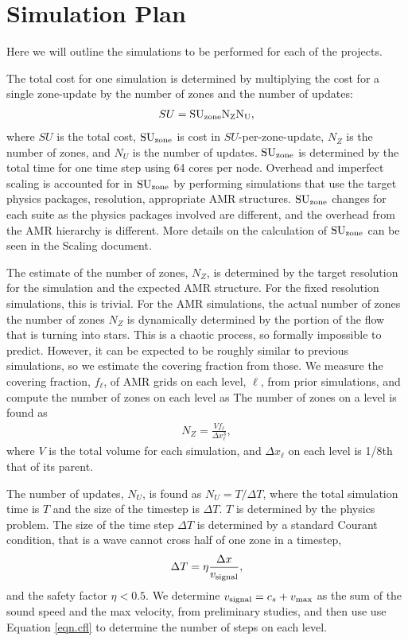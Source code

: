 \section{Simulation Plan}
\label{sec.plan}

Here we will outline the simulations to be performed for each of the projects.

The total cost for one simulation is determined by multiplying the cost for a
single zone-update by the number of zones and the number of updates:
\begin{align}
SU = \rm{SU}_{\rm{zone}} N_Z N_U,
\end{align}
where $SU$ is the total cost, $\rm{SU}_{\rm{zone}}$ is cost in
$SU$-per-zone-update, $N_Z$ is the number of zones, and $N_U$ is the number of
updates.
$\rm{SU}_{\rm{zone}}$ is determined by the total time for one time step using 64 cores per
node. Overhead and
imperfect scaling is
accounted for in $\rm{SU}_{\rm{zone}}$ by performing simulations that use the target physics
packages, resolution, appropriate AMR structures. $\rm{SU}_{\rm{zone}}$ changes for each suite as the physics packages involved are
different, and the overhead from the AMR hierarchy is different.    More details
on the calculation of $\rm{SU}_{\rm{zone}}$ can be seen in the
Scaling document.

The estimate of the number of zones, $N_Z$,
is determined by the target resolution for the simulation and the expected AMR
structure.  For the fixed
resolution simulations, this is trivial.  
For the AMR
simulations, the actual number of zones  the
number of zones $N_Z$ is dynamically determined by the portion of the flow
that is turning into stars.  This is a chaotic process, so formally impossible
to predict.
However, it can be expected to be roughly similar to
previous simulations, so we estimate the covering fraction from those.   
We measure the covering fraction, $f_\ell$, of AMR grids on each level, $\ell$,
from prior simulations, and compute the number of zones on each level as
The number of zones on a level is found as
\begin{align}
    N_Z = \frac{V f_\ell}{\Delta x_\ell^3},
\end{align}
where $V$ is the total volume for each simulation, and $\Delta x_\ell$ on each level is 1/8th that of its parent.


The number of updates, $N_U$, is found as
$N_U=T/\Delta T$, where the total simulation time is $T$ and the size of the
timestep is $\Delta T$.  $T$ is determined by the physics
problem.  The size of the time step $\Delta T$ is
determined by a standard Courant condition, that is a wave cannot cross half of
one zone in a timestep, 
\begin{align}
\Delta T = \eta \frac{\Delta
x}{v_{\rm{signal}}}, \label{eqn.cfl}
\end{align}
and the safety factor $\eta < 0.5$.  We determine $v_{\rm{signal}}=c_s+v_{\rm{max}}$
 as the sum of the sound speed and the max velocity, from preliminary studies, and then use use Equation \ref{eqn.cfl} to
determine the number of steps on each level.

